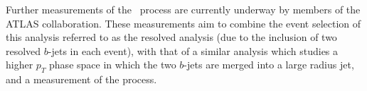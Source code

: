 Further measurements of the \VHbb\ process are currently underway by members of
the ATLAS collaboration. These measurements aim to combine the event selection
of this analysis referred to as the resolved analysis (due to the inclusion of
two resolved $b$-jets in each event), with that of a similar analysis which
studies a higher $p_T$ phase space in which the two $b$-jets are merged into a
large radius jet, and a measurement of the \VHcc process.